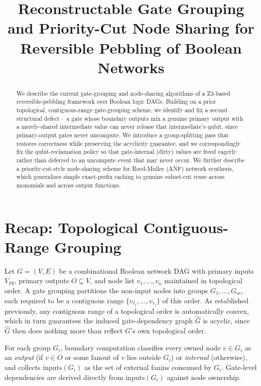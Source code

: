 \documentclass[conference]{IEEEtran}
\begin{document}
\title{Reconstructable Gate Grouping and Priority-Cut Node Sharing for
Reversible Pebbling of Boolean Networks}

\author{
}

\maketitle

\begin{abstract}
We describe the current gate-grouping and node-sharing algorithms of a
Z3-based reversible-pebbling framework over Boolean logic DAGs. Building
on a prior topological, contiguous-range gate-grouping scheme, we
identify and fix a second structural defect -- a gate whose boundary
outputs mix a genuine primary output with a merely-shared intermediate
value can never release that intermediate's qubit, since primary-output
gates never uncompute. We introduce a group-splitting pass that
restores correctness while preserving the acyclicity guarantee, and we
correspondingly fix the qubit-reclamation policy so that gate-internal
(dirty) values are freed eagerly rather than deferred to an uncompute
event that may never occur. We further describe a priority-cut-style
node-sharing scheme for Reed-Muller (ANF) network synthesis, which
generalizes simple exact-prefix caching to genuine subset-cut reuse
across monomials and across output functions.
\end{abstract}

\section{Recap: Topological Contiguous-Range Grouping}

Let $G=(V,E)$ be a combinational Boolean network DAG with primary
inputs $V_{PI}$, primary outputs $O\subseteq V$, and node list
$v_1,\dots,v_n$ maintained in topological order. A gate grouping
partitions the non-input nodes into groups $G_1,\dots,G_m$, each
required to be a contiguous range $\{v_{\ell_i},\dots,v_{r_i}\}$ of
this order. As established previously, any contiguous range of a
topological order is automatically convex, which in turn guarantees the
induced gate-dependency graph $\widehat G$ is acyclic, since
$\widehat G$ then does nothing more than reflect $G$'s own topological
order.

For each group $G_i$, boundary computation classifies every owned node
$v\in G_i$ as an \emph{output} (if $v\in O$ or some fanout of $v$ lies
outside $G_i$) or \emph{internal} (otherwise), and collects
$\mathrm{inputs}(G_i)$ as the set of external fanins consumed by $G_i$.
Gate-level dependencies are derived directly from
$\mathrm{inputs}(G_i)$ against node ownership.
\end{document}
